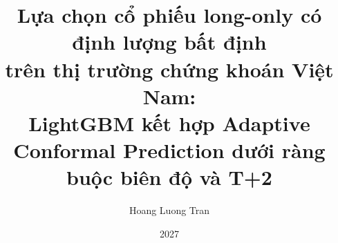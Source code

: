 \documentclass[12pt,a4paper]{report}
\title{Lựa chọn cổ phiếu long-only có định lượng bất định\\
trên thị trường chứng khoán Việt Nam:\\
LightGBM kết hợp Adaptive Conformal Prediction dưới ràng buộc biên độ và T+2}
\author{Hoang Luong Tran}
\date{2027}
\begin{document}
\maketitle
\begin{abstract}
\end{abstract}
\tableofcontents








\printbibliography
\appendix

\end{document}
